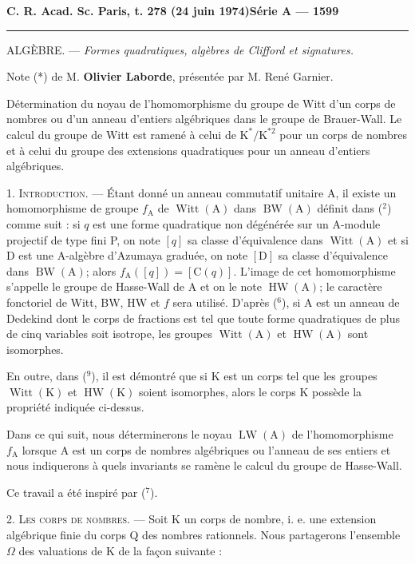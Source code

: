 \textbf{C. R. Acad. Sc. Paris, t. 278 (24 juin 1974)}\hfill\textbf{Série A — 1599}

\rule{\linewidth}{0.4pt}

ALGÈBRE. — \emph{Formes quadratiques, algèbres de Clifford et signatures.}

Note (*) de M. \textbf{Olivier Laborde}, présentée par M. René Garnier.

Détermination du noyau de l'homomorphisme du groupe de Witt d'un corps de nombres ou
d'un anneau d'entiers algébriques dans le groupe de Brauer-Wall. Le calcul du groupe de Witt
est ramené à celui de $\mathrm K^*/\mathrm K^{*2}$ pour un corps de nombres et à celui du groupe des extensions
quadratiques pour un anneau d'entiers algébriques.

1. \textsc{Introduction}. — Étant donné un anneau commutatif unitaire A, il existe un homomorphisme
de groupe $f_{\mathrm A}$ de $\operatorname{Witt}(\mathrm A)$ dans $\operatorname{BW}(\mathrm A)$ définit dans (${}^2$) comme suit : si $q$ est
une forme quadratique non dégénérée sur un A-module projectif de type fini P, on note $[q]$
sa classe d'équivalence dans $\operatorname{Witt}(\mathrm A)$ et si D est une A-algèbre d'Azumaya graduée,
on note $[\mathrm D]$ sa classe d'équivalence dans $\operatorname{BW}(\mathrm A)$; alors $f_{\mathrm A}([q])=[\mathrm C(q)]$. L'image
de cet homomorphisme s'appelle le groupe de Hasse-Wall de A et on le note $\operatorname{HW}(\mathrm A)$;
le caractère fonctoriel de Witt, BW, HW et $f$ sera utilisé. D'après (${}^6$), si A est un anneau
de Dedekind dont le corps de fractions est tel que toute forme quadratiques de plus de
cinq variables soit isotrope, les groupes $\operatorname{Witt}(\mathrm A)$ et $\operatorname{HW}(\mathrm A)$ sont isomorphes.

En outre, dans (${}^9$), il est démontré que si K est un corps tel que les groupes $\operatorname{Witt}(\mathrm K)$
et $\operatorname{HW}(\mathrm K)$ soient isomorphes, alors le corps K possède la propriété indiquée ci-dessus.

Dans ce qui suit, nous déterminerons le noyau $\operatorname{LW}(\mathrm A)$ de l'homomorphisme $f_{\mathrm A}$ lorsque A
est un corps de nombres algébriques ou l'anneau de ses entiers et nous indiquerons à quels
invariants se ramène le calcul du groupe de Hasse-Wall.

Ce travail a été inspiré par (${}^7$).

2. \textsc{Les corps de nombres}. — Soit K un corps de nombre, i. e. une extension algébrique
finie du corps Q des nombres rationnels. Nous partagerons l'ensemble $\Omega$ des valuations
de K de la façon suivante :

